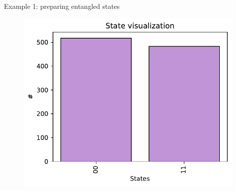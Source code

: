 \documentclass[8pt, xcolor={svgnames}, hyperref={linkcolor=black}]{beamer}
\begin{document}
\begin{frame}{Example 1: preparing entangled states}
\begin{multicols}{2}
\begin{figure}
   \includegraphics[width=.8\linewidth]{figures/bell.pdf} %
\end{figure}   
\end{multicols} 
\end{frame}
\end{document}
